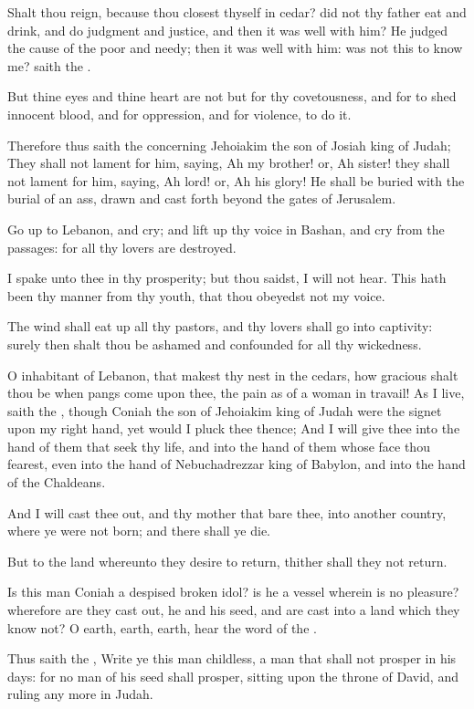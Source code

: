 \verse Shalt thou reign, because thou closest thyself in cedar? did not thy father eat and drink, and do judgment and justice, and then it was well with him?  \verse He judged the cause of the poor and needy; then it was well with him: was not this to know me? saith the \LORD.

\verse But thine eyes and thine heart are not but for thy covetousness, and for to shed innocent blood, and for oppression, and for violence, to do it.

\verse Therefore thus saith the \LORD concerning Jehoiakim the son of Josiah king of Judah; They shall not lament for him, saying, Ah my brother! or, Ah sister! they shall not lament for him, saying, Ah lord! or, Ah his glory!  \verse He shall be buried with the burial of an ass, drawn and cast forth beyond the gates of Jerusalem.

\verse Go up to Lebanon, and cry; and lift up thy voice in Bashan, and cry from the passages: for all thy lovers are destroyed.

\verse I spake unto thee in thy prosperity; but thou saidst, I will not hear. This hath been thy manner from thy youth, that thou obeyedst not my voice.

\verse The wind shall eat up all thy pastors, and thy lovers shall go into captivity: surely then shalt thou be ashamed and confounded for all thy wickedness.

\verse O inhabitant of Lebanon, that makest thy nest in the cedars, how gracious shalt thou be when pangs come upon thee, the pain as of a woman in travail!  \verse As I live, saith the \LORD, though Coniah the son of Jehoiakim king of Judah were the signet upon my right hand, yet would I pluck thee thence; \verse And I will give thee into the hand of them that seek thy life, and into the hand of them whose face thou fearest, even into the hand of Nebuchadrezzar king of Babylon, and into the hand of the Chaldeans.

\verse And I will cast thee out, and thy mother that bare thee, into another country, where ye were not born; and there shall ye die.

\verse But to the land whereunto they desire to return, thither shall they not return.

\verse Is this man Coniah a despised broken idol? is he a vessel wherein is no pleasure? wherefore are they cast out, he and his seed, and are cast into a land which they know not?  \verse O earth, earth, earth, hear the word of the \LORD.

\verse Thus saith the \LORD, Write ye this man childless, a man that shall not prosper in his days: for no man of his seed shall prosper, sitting upon the throne of David, and ruling any more in Judah.


